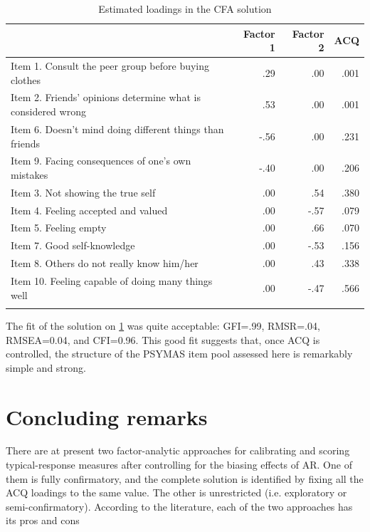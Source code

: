 \begin{table}[H]
  \caption{\label{tab8}Estimated loadings in the CFA solution}
  \centering
  \begin{tabular}{ l r r r}
    \hline\noalign{\smallskip}
    & Factor 1  & Factor 2  &  ACQ\\
    \hline\noalign{\smallskip}
    Item 1. Consult the peer group before buying clothes      & .29    & .00    & .001 \\
    Item 2. Friends' opinions determine what is considered wrong  & .53    & .00    & .001 \\
    Item 6. Doesn't mind doing different things than friends      & -.56  & .00    & .231 \\
    Item 9. Facing consequences of one's own mistakes      & -.40  & .00    & .206 \\
    Item 3. Not showing the true self              & .00    & .54    & .380 \\
    Item 4. Feeling accepted and valued            & .00    & -.57  & .079 \\
    Item 5. Feeling empty                  & .00    & .66    & .070 \\
    Item 7. Good self-knowledge              & .00    & -.53  & .156 \\
    Item 8. Others do not really know him/her          & .00    & .43    & .338 \\
    Item 10. Feeling capable of doing many things well      & .00    & -.47  & .566 \\
    \hline\noalign{\smallskip}
    \multicolumn{4}{l}{Note: ACQ = Acquiescence}
  \end{tabular}
\end{table}

The fit of the solution on \cref{tab8} was quite acceptable: GFI=.99, RMSR=.04, RMSEA=0.04, and CFI=0.96. This good fit suggests that, once ACQ is controlled, the structure of the PSYMAS item pool assessed here is remarkably simple and strong.

\section{Concluding remarks}

There are at present two factor-analytic approaches for calibrating and scoring typical-response measures after controlling for the biasing effects of AR. One of them is fully confirmatory, and the complete solution is identified by fixing all the ACQ loadings to the same value. The other is unrestricted (i.e. exploratory or semi-confirmatory). According to the literature, each of the two approaches has its pros and cons \citep{Savalei:2014, delaFuente:2020}

